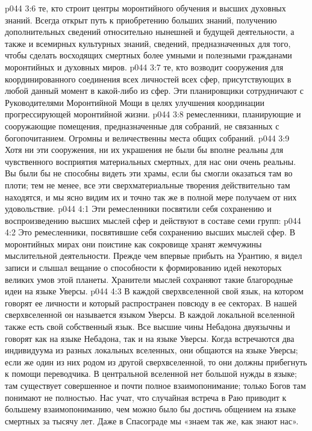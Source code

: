 \vs p044 3:6 \pc {}\bibnobreakspace {} те, кто строит центры моронтийного обучения и высших духовных знаний. Всегда открыт путь к приобретению больших знаний, получению дополнительных сведений относительно нынешней и будущей деятельности, а также и всемирных культурных знаний, сведений, предназначенных для того, чтобы сделать восходящих смертных более умными и полезными гражданами моронтийных и духовных миров.
\vs p044 3:7 \pc {}\bibnobreakspace {} те, кто возводит сооружения для координированного соединения всех личностей всех сфер, присутствующих в любой данный момент в какой\hyp{}либо из сфер. Эти планировщики сотрудничают с Руководителями Моронтийной Мощи в целях улучшения координации прогрессирующей моронтийной жизни.
\vs p044 3:8 \pc {}\bibnobreakspace {} ремесленники, планирующие и сооружающие помещения, предназначенные для собраний, не связанных с богопочитанием. Огромны и величественны места общих собраний.
\vs p044 3:9 Хотя ни эти сооружения, ни их украшения не были бы вполне реальны для чувственного восприятия материальных смертных, для нас они очень реальны. Вы были бы не способны видеть эти храмы, если бы смогли оказаться там во плоти; тем не менее, все эти сверхматериальные творения действительно там находятся, и мы ясно видим их и точно так же в полной мере получаем от них удовольствие.
\vs p044 4:1 Эти ремесленники посвятили себя сохранению и воспроизведению высших мыслей сфер и действуют в составе семи групп:
\vs p044 4:2 \pc {}\bibnobreakspace {} Это ремесленники, посвятившие себя сохранению высших мыслей сфер. В моронтийных мирах они поистине как сокровище хранят жемчужины мыслительной деятельности. Прежде чем впервые прибыть на Урантию, я видел записи и слышал вещание о способности к формированию идей некоторых великих умов этой планеты. Хранители мыслей сохраняют такие благородные идеи на языке Уверсы.
\vs p044 4:3 В каждой сверхвселенной свой язык, на котором говорят ее личности и который распространен повсюду в ее секторах. В нашей сверхвселенной он называется языком Уверсы. В каждой локальной вселенной также есть свой собственный язык. Все высшие чины Небадона двуязычны и говорят как на языке Небадона, так и на языке Уверсы. Когда встречаются два индивидуума из разных локальных вселенных, они общаются на языке Уверсы; если же один из них родом из другой сверхвселенной, то они должны прибегнуть к помощи переводчика. В центральной вселенной нет большой нужды в языке; там существует совершенное и почти полное взаимопонимание; только Богов там понимают не полностью. Нас учат, что случайная встреча в Раю приводит к большему взаимопониманию, чем можно было бы достичь общением на языке смертных за тысячу лет. Даже в Спасограде мы «знаем так же, как знают нас».
